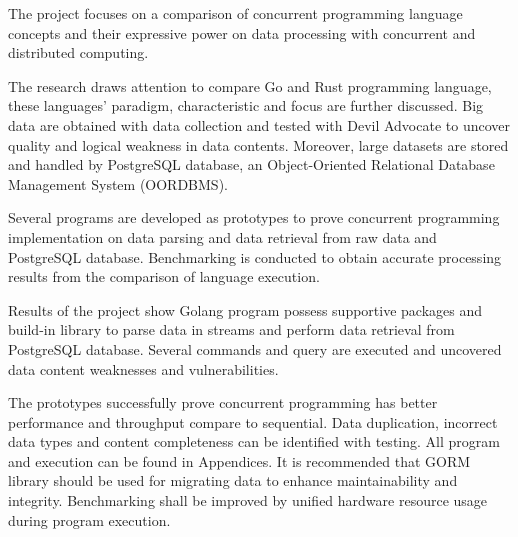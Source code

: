 \documentclass[12pt, oneside]{Thesis}
\begin{document}
\pagebreak
{} 

The project focuses on a comparison of concurrent programming language concepts and their expressive power on data processing with concurrent and distributed computing.

The research draws attention to compare Go and Rust programming language, these languages’ paradigm, characteristic and focus are further discussed. Big data are obtained with data collection and tested with Devil Advocate to uncover quality and logical weakness in data contents. Moreover, large datasets are stored and handled by PostgreSQL database, an Object-Oriented Relational Database Management System (OORDBMS). 

Several programs are developed as prototypes to prove concurrent programming implementation on data parsing and data retrieval from raw data and PostgreSQL database. Benchmarking is conducted to obtain accurate processing results from the comparison of language execution. 

Results of the project show Golang program possess supportive packages and build-in library to parse data in streams and perform data retrieval from PostgreSQL database. Several commands and query are executed and uncovered data content weaknesses and vulnerabilities. 

The prototypes successfully prove concurrent programming has better performance and throughput compare to sequential. Data duplication, incorrect data types and content completeness can be identified with testing. All program and execution can be found in Appendices. It is recommended that GORM library should be used for migrating data to enhance maintainability and integrity. Benchmarking shall be improved by unified hardware resource usage during program execution. 


\clearpage %
\pagebreak

\mainmatter 

\pagestyle{fancy} 

\raggedright


\end{document}

